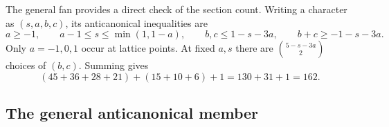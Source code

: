 The general fan provides a direct check of the section count.
Writing a character as $(s,a,b,c)$, its anticanonical inequalities
are
\[
a\ge-1,\qquad a-1\le s\le\min(1,1-a),\qquad
b,c\le1-s-3a,\qquad b+c\ge-1-s-3a.
\]
Only $a=-1,0,1$ occur at lattice points.  At fixed $a,s$ there are
$\binom{5-s-3a}{2}$ choices of $(b,c)$.  Summing gives
\[
(45+36+28+21)+(15+10+6)+1=130+31+1=162.
\]

\subsection{The general anticanonical member}
